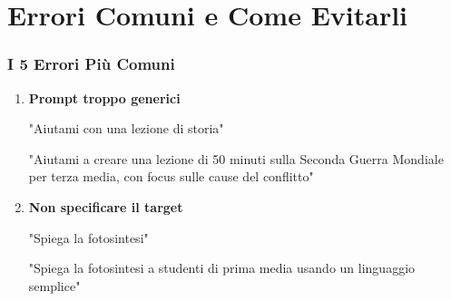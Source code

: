 \documentclass[aspectratio=169]{beamer}
\begin{document}
\section{Errori Comuni e Come Evitarli}
%
%
\begin{frame}
\frametitle{I 5 Errori Più Comuni}
\begin{enumerate}[<+->]
    \item \textbf{Prompt troppo generici}
    \vspace{0.2cm}
    \begin{warningbox}[Sbagliato]
    "Aiutami con una lezione di storia"
    \end{warningbox}
    \begin{examplebox}[Corretto]
    "Aiutami a creare una lezione di 50 minuti sulla Seconda Guerra Mondiale per terza media, con focus sulle cause del conflitto"
    \end{examplebox}
    
    \item \textbf{Non specificare il target}
    \vspace{0.2cm}
    \begin{warningbox}[Sbagliato]
    "Spiega la fotosintesi"
    \end{warningbox}
    \begin{examplebox}[Corretto]
    "Spiega la fotosintesi a studenti di prima media usando un linguaggio semplice"
    \end{examplebox}
\end{enumerate}
\end{frame}
%
%
\end{document}
